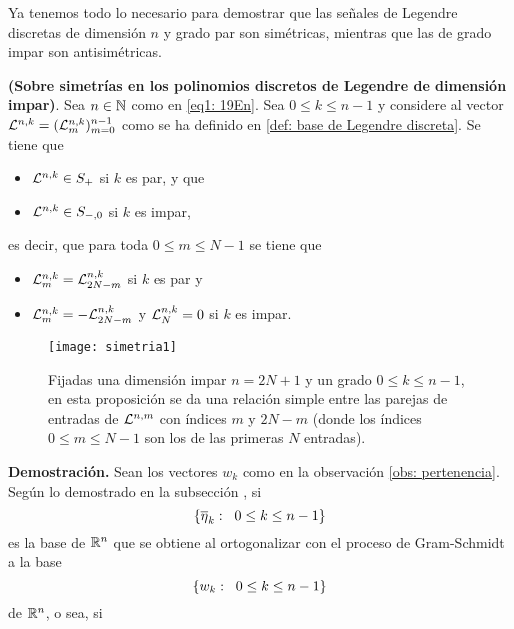 \QEDB
\vspace{0.2cm}



Ya tenemos todo lo necesario para demostrar que las
señales de Legendre discretas de dimensión $n$ y grado
par son simétricas, mientras que las de grado
impar son antisimétricas.

\begin{teo}
\label{prop: simetrias en dimensiones impares}
\textbf{(Sobre simetrías
en los polinomios discretos de Legendre de dimensión impar)}. 
Sea $n \in \mathbb{N}$ como en \eqref{eq1: 19En}.
Sea $0 \leq k \leq n-1$ y
considere al vector $\mathcal{L}^{n,k}=(\mathcal{L}^{n,k}_{m})_{m=0}^{n-1}$
como se ha definido en \eqref{def: base de Legendre discreta}. 
Se tiene que 
\begin{itemize}
\item $\mathcal{L}^{n,k} \in S_{+}$ si $k$ es par, y que
\item $\mathcal{L}^{n,k} \in S_{-,0}$ si $k$ es impar,
\end{itemize}
es decir, que para toda $0 \leq m \leq N-1$ se tiene que
\begin{itemize}
\item $\mathcal{L}^{n,k}_{m} = \mathcal{L}^{n,k}_{2N-m}$ si $k$ es par y
\item $\mathcal{L}^{n,k}_{m} = -\mathcal{L}^{n,k}_{2N-m}$ y 
$\mathcal{L}^{n, k}_{N}=0$ si $k$ es impar.
\end{itemize}
\end{teo}
\begin{figure}[H]
\centering\captionsetup{format = hang}
	\begin{measuredfigure}
		\texttt{[image: simetria1]} 
		\caption{Fijadas una dimensión impar $n=2N+1$ 
		y un grado $0 \leq k \leq n-1$,
		en esta proposición se da una relación simple entre las parejas 
		de entradas de $\mathcal{L}^{n,m}$ con índices $m$ y $2N-m$ 
		(donde los índices $0 \leq m \leq N-1$ son los de las primeras
		$N$ entradas).}
 	\end{measuredfigure}
 \end{figure}

\noindent
\textbf{Demostración.}
Sean los vectores $w_{k}$ como en la observación 
\ref{obs: pertenencia}.
Según lo demostrado en la subsección , si
\[
\{ \overline{\eta}_{k} : \hspace{0.2cm} 0 \leq k \leq n-1 \}
\]
es la base de $\mathbb{R}^{n}$ que se obtiene al ortogonalizar 
con el proceso de Gram-Schmidt a la base
\[
\{ w_{k} : \hspace{0.2cm} 0 \leq k \leq n-1 \}
\]
de $\mathbb{R}^{n}$,
o sea, si 

